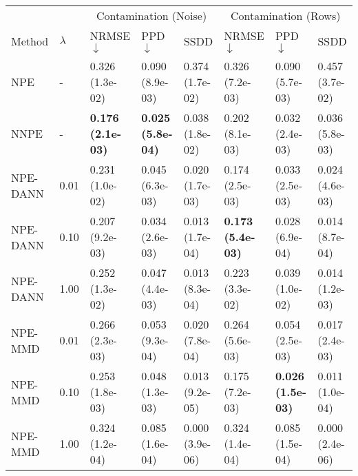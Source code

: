     \begin{tabular}{ ll |lll|lll}
     \toprule
            &           & \multicolumn{3}{c}{Contamination (Noise)} & \multicolumn{3}{c}{Contamination (Rows)} \\
     Method & $\lambda$ & NRMSE $\downarrow$ & PPD $\downarrow$ & SSDD& NRMSE $\downarrow$ & PPD $\downarrow$ & SSDD \\
     \midrule
NPE & - & \cellcolor{lime!0} 0.326 (1.3e-02) & \cellcolor{lime!0} 0.090 (8.9e-03) & \cellcolor{LightSkyBlue1!0} 0.374 (1.7e-02) & \cellcolor{lime!0} 0.326 (7.2e-03) & \cellcolor{lime!0} 0.090 (5.7e-03) & \cellcolor{LightSkyBlue1!0} 0.457 (3.7e-02) \vspace{0.1cm}\\
NNPE & - & \cellcolor{lime!100} \textbf{0.176 (2.1e-03)} & \cellcolor{lime!100} \textbf{0.025 (5.8e-04)} & \cellcolor{LightSkyBlue1!89} 0.038 (1.8e-02) & \cellcolor{lime!81} 0.202 (8.1e-03) & \cellcolor{lime!91} 0.032 (2.4e-03) & \cellcolor{LightSkyBlue1!92} 0.036 (5.8e-03) \vspace{0.1cm}\\
NPE-DANN & 0.01 & \cellcolor{lime!63} 0.231 (1.0e-02) & \cellcolor{lime!68} 0.045 (6.3e-03) & \cellcolor{LightSkyBlue1!94} 0.020 (1.7e-03) & \cellcolor{lime!99} 0.174 (2.5e-03) & \cellcolor{lime!89} 0.033 (2.5e-03) & \cellcolor{LightSkyBlue1!94} 0.024 (4.6e-03) \\
NPE-DANN & 0.10 & \cellcolor{lime!79} 0.207 (9.2e-03) & \cellcolor{lime!86} 0.034 (2.6e-03) & \cellcolor{LightSkyBlue1!96} 0.013 (1.7e-04) & \cellcolor{lime!100} \textbf{0.173 (5.4e-03)} & \cellcolor{lime!97} 0.028 (6.9e-04) & \cellcolor{LightSkyBlue1!97} 0.014 (8.7e-04) \\
NPE-DANN & 1.00 & \cellcolor{lime!49} 0.252 (1.3e-02) & \cellcolor{lime!66} 0.047 (4.4e-03) & \cellcolor{LightSkyBlue1!96} 0.013 (8.3e-04) & \cellcolor{lime!67} 0.223 (3.3e-02) & \cellcolor{lime!80} 0.039 (1.0e-02) & \cellcolor{LightSkyBlue1!96} 0.014 (1.2e-03) \vspace{0.1cm}\\
NPE-MMD & 0.01 & \cellcolor{lime!40} 0.266 (2.3e-03) & \cellcolor{lime!56} 0.053 (9.3e-04) & \cellcolor{LightSkyBlue1!94} 0.020 (7.8e-04) & \cellcolor{lime!40} 0.264 (5.6e-03) & \cellcolor{lime!57} 0.054 (2.5e-03) & \cellcolor{LightSkyBlue1!96} 0.017 (2.4e-03) \\
NPE-MMD & 0.10 & \cellcolor{lime!48} 0.253 (1.8e-03) & \cellcolor{lime!65} 0.048 (1.3e-03) & \cellcolor{LightSkyBlue1!96} 0.013 (9.2e-05) & \cellcolor{lime!98} 0.175 (7.2e-03) & \cellcolor{lime!100} \textbf{0.026 (1.5e-03)} & \cellcolor{LightSkyBlue1!97} 0.011 (1.0e-04) \\
NPE-MMD & 1.00 & \cellcolor{lime!1} 0.324 (1.2e-04) & \cellcolor{lime!6} 0.085 (1.6e-04) & \cellcolor{LightSkyBlue1!100} 0.000 (3.9e-06) & \cellcolor{lime!1} 0.324 (1.4e-04) & \cellcolor{lime!8} 0.085 (1.5e-04) & \cellcolor{LightSkyBlue1!100} 0.000 (2.4e-06) \vspace{0.1cm}\\

     \hline
    \end{tabular}
